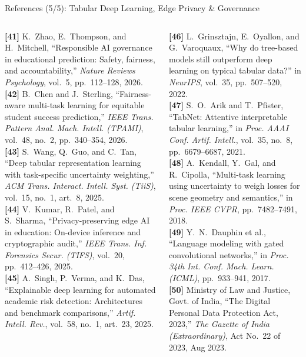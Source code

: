 \documentclass{beamer}
\begin{document}
\begin{frame}[t]{References (5/5): Tabular Deep Learning, Edge Privacy \& Governance}
  \begin{columns}[T]
    \fontsize{5.2pt}{6.4pt}\selectfont
    \textbf{[41]} K.~Zhao, E.~Thompson, and H.~Mitchell, ``Responsible AI governance in educational prediction: Safety, fairness, and accountability,'' \textit{Nature Reviews Psychology}, vol.~5, pp.~112--128, 2026.\\[4pt]
    \textbf{[42]} B.~Chen and J.~Sterling, ``Fairness-aware multi-task learning for equitable student success prediction,'' \textit{IEEE Trans. Pattern Anal. Mach. Intell. (TPAMI)}, vol.~48, no.~2, pp.~340--354, 2026.\\[4pt]
    \textbf{[43]} S.~Wang, Q.~Guo, and C.~Tan, ``Deep tabular representation learning with task-specific uncertainty weighting,'' \textit{ACM Trans. Interact. Intell. Syst. (TiiS)}, vol.~15, no.~1, art.~8, 2025.\\[4pt]
    \textbf{[44]} V.~Kumar, R.~Patel, and S.~Sharma, ``Privacy-preserving edge AI in education: On-device inference and cryptographic audit,'' \textit{IEEE Trans. Inf. Forensics Secur. (TIFS)}, vol.~20, pp.~412--426, 2025.\\[4pt]
    \textbf{[45]} A.~Singh, P.~Verma, and K.~Das, ``Explainable deep learning for automated academic risk detection: Architectures and benchmark comparisons,'' \textit{Artif. Intell. Rev.}, vol.~58, no.~1, art.~23, 2025.

    \fontsize{5.2pt}{6.4pt}\selectfont
    \textbf{[46]} L.~Grinsztajn, E.~Oyallon, and G.~Varoquaux, ``Why do tree-based models still outperform deep learning on typical tabular data?'' in \textit{NeurIPS}, vol.~35, pp.~507--520, 2022.\\[4pt]
    \textbf{[47]} S.~O.~Arik and T.~Pfister, ``TabNet: Attentive interpretable tabular learning,'' in \textit{Proc. AAAI Conf. Artif. Intell.}, vol.~35, no.~8, pp.~6679--6687, 2021.\\[4pt]
    \textbf{[48]} A.~Kendall, Y.~Gal, and R.~Cipolla, ``Multi-task learning using uncertainty to weigh losses for scene geometry and semantics,'' in \textit{Proc. IEEE CVPR}, pp.~7482--7491, 2018.\\[4pt]
    \textbf{[49]} Y.~N.~Dauphin et al., ``Language modeling with gated convolutional networks,'' in \textit{Proc. 34th Int. Conf. Mach. Learn. (ICML)}, pp.~933--941, 2017.\\[4pt]
    \textbf{[50]} Ministry of Law and Justice, Govt. of India, ``The Digital Personal Data Protection Act, 2023,'' \textit{The Gazette of India (Extraordinary)}, Act No.~22 of 2023, Aug 2023.
  \end{columns}
\end{frame}
\end{document}
